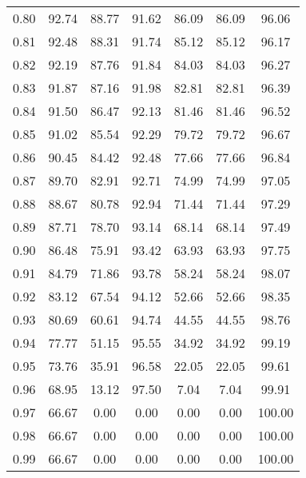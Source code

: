 \begin{tabular}{|c|c|c|c|c|c|c|}
      0.80 &     92.74 &     88.77 &      91.62 &   86.09 &      86.09 &         96.06 \\
      0.81 &     92.48 &     88.31 &      91.74 &   85.12 &      85.12 &         96.17 \\
      0.82 &     92.19 &     87.76 &      91.84 &   84.03 &      84.03 &         96.27 \\
      0.83 &     91.87 &     87.16 &      91.98 &   82.81 &      82.81 &         96.39 \\
      0.84 &     91.50 &     86.47 &      92.13 &   81.46 &      81.46 &         96.52 \\
      0.85 &     91.02 &     85.54 &      92.29 &   79.72 &      79.72 &         96.67 \\
      0.86 &     90.45 &     84.42 &      92.48 &   77.66 &      77.66 &         96.84 \\
      0.87 &     89.70 &     82.91 &      92.71 &   74.99 &      74.99 &         97.05 \\
      0.88 &     88.67 &     80.78 &      92.94 &   71.44 &      71.44 &         97.29 \\
      0.89 &     87.71 &     78.70 &      93.14 &   68.14 &      68.14 &         97.49 \\
      0.90 &     86.48 &     75.91 &      93.42 &   63.93 &      63.93 &         97.75 \\
      0.91 &     84.79 &     71.86 &      93.78 &   58.24 &      58.24 &         98.07 \\
      0.92 &     83.12 &     67.54 &      94.12 &   52.66 &      52.66 &         98.35 \\
      0.93 &     80.69 &     60.61 &      94.74 &   44.55 &      44.55 &         98.76 \\
      0.94 &     77.77 &     51.15 &      95.55 &   34.92 &      34.92 &         99.19 \\
      0.95 &     73.76 &     35.91 &      96.58 &   22.05 &      22.05 &         99.61 \\
      0.96 &     68.95 &     13.12 &      97.50 &    7.04 &       7.04 &         99.91 \\
      0.97 &     66.67 &      0.00 &       0.00 &    0.00 &       0.00 &        100.00 \\
      0.98 &     66.67 &      0.00 &       0.00 &    0.00 &       0.00 &        100.00 \\
      0.99 &     66.67 &      0.00 &       0.00 &    0.00 &       0.00 &        100.00 \\
\bottomrule
\end{tabular}
